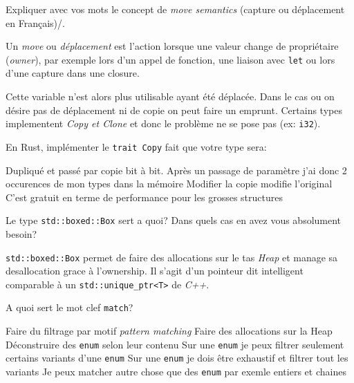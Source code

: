 \documentclass[11pt,a4paper,addpoint,answers]{exam}
\begin{document}
\begin{questions}
\question[1] Expliquer avec vos mots le concept de \emph{move semantics} (capture ou déplacement en Français)/.
\ifprintanswers
\begin{solution}
Un \emph{move} ou \emph{déplacement} est l'action lorsque une valeur change de propriétaire (\emph{owner}),
par exemple lors d'un appel de fonction, une liaison avec \texttt{let} ou lors d'une capture dans une closure.

Cette variable n'est alors plus utilisable ayant été déplacée. Dans le cas ou on désire pas
de déplacement ni de copie on peut faire un emprunt.
Certains types implementent \emph{Copy et Clone} et donc le problème ne se pose pas (ex: \texttt{i32}).
\end{solution}
\else
\vspace{2in}
\fi

\newpage
\question[1] En Rust, implémenter le \texttt{trait Copy} fait que votre type sera:
    \begin{checkboxes}
        \CorrectChoice Dupliqué et passé par copie bit à bit.
        \CorrectChoice Après un passage de paramètre j'ai donc 2 occurences de mon types dans la mémoire
        \choice Modifier la copie modifie l'original
        \choice C'est gratuit en terme de performance pour les grosses structures
   \end{checkboxes}

    \question[1] Le type \texttt{std::boxed::Box} sert a quoi? Dans quels cas en avez vous absolument
    besoin?
\ifprintanswers
\begin{solution}
\texttt{std::boxed::Box} permet de faire des allocations sur le tas \emph{Heap} et manage sa
desallocation grace à l'ownership. Il s'agit d'un pointeur dit intelligent comparable à un \texttt{std::unique_ptr<T>} de \emph{C++}.
\end{solution}
\else
\vspace{2in}
\fi

\question[1] A quoi sert le mot clef \texttt{match}?
\begin{checkboxes}
    \CorrectChoice Faire du filtrage par motif \emph{pattern matching}
    \choice Faire des allocations sur la Heap
    \CorrectChoice Déconstruire des \texttt{enum} selon leur contenu
    \choice Sur une \texttt{enum} je peux filtrer seulement certains variants d'une \texttt{enum}
    \CorrectChoice Sur une \texttt{enum} je dois être exhaustif et filtrer tout les variants
    \CorrectChoice Je peux matcher autre chose que des \texttt{enum} par exemle entiers et chaines
\end{checkboxes}


\end{questions}
\end{document}
